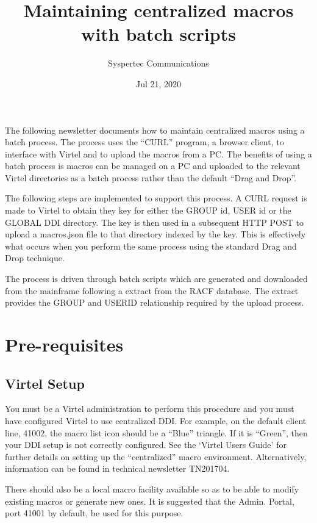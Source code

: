 \documentclass[letterpaper,10pt,english]{sphinxmanual}
\title{Maintaining centralized macros with batch scripts}
\date{Jul 21, 2020}
\author{Syspertec Communications}
\begin{document}
\pagestyle{empty}
\sphinxmaketitle
\pagestyle{plain}
\sphinxtableofcontents
\pagestyle{normal}
\label{\detokenize{TN201903::doc}}


The following newsletter documents how to maintain centralized macros using a batch process. The process uses the “CURL” program, a browser client, to interface with Virtel and to upload the macros from a PC. The benefits of using a batch process is macros can be managed on a PC and uploaded to the relevant Virtel directories as a batch process rather than the default “Drag and Drop”.

The following steps are implemented to support this process. A CURL request is made to Virtel to obtain they key for either the GROUP id, USER id or the GLOBAL DDI directory. The key is then used in a subsequent HTTP POST to upload a macros.json file to that directory indexed by the key. This is effectively what occurs when you perform the same process using the standard Drag and Drop technique.

The process is driven through batch scripts which are generated and downloaded from the mainframe following a extract from the RACF database. The extract provides the GROUP and USERID relationship required by the upload process.


\chapter{Pre-requisites}
\label{\detokenize{TN201903:pre-requisites}}

\section{Virtel Setup}
\label{\detokenize{TN201903:virtel-setup}}
You must be a Virtel administration to perform this procedure and you must have configured Virtel to use centralized DDI. For example, on the default client line, 41002, the macro list icon should be a “Blue” triangle. If it is “Green”, then your DDI setup is not correctly configured. See the ‘Virtel Users Guide’ for further details on setting up the “centralized” macro environment. Alternatively, information can be found in technical newsletter TN201704.

There should also be a local macro facility available so as to be able to modify existing macros or generate new ones. It is suggested that the Admin. Portal, port 41001 by default, be used for this purpose.
\end{document}
